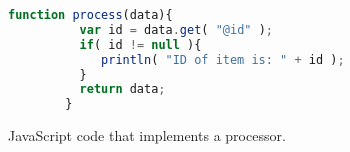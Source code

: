 \begin{figure}[h!]
  \centering
  \begin{lstlisting}[language=JavaScript,showspaces=false,showstringspaces=false]
       function process(data){
          var id = data.get( "@id" );
          if( id != null ){
             println( "ID of item is: " + id );
          }
          return data;
        }
  \end{lstlisting}
  \caption{\label{fig:javascriptProcessor}JavaScript code that implements a processor.}
\end{figure}